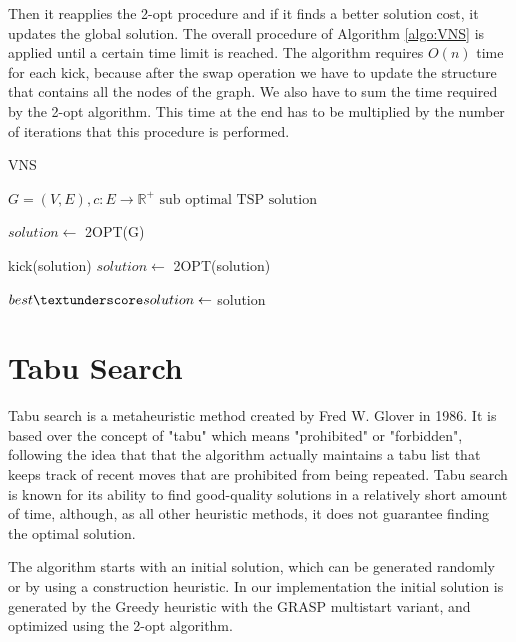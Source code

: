 Then it reapplies the 2-opt procedure and if it finds a better solution cost, it updates the global solution.
The overall procedure of Algorithm \ref{algo:VNS} is applied until a certain time limit is reached.
The algorithm requires $O(n)$ time for each kick, because after the swap operation we have to update the structure that contains all the nodes of the graph. We also have to sum the time required by the 2-opt algorithm. This time at the end has to be multiplied by the number of iterations that this procedure is performed. 

\begin{algorithm}[h!]
    \caption{VNS}\label{algo:VNS}
    \begin{algorithmic}[1]
    \Require $G = (V,E), c:E \to \mathbb{R}^+$
    \Ensure $\text{sub optimal TSP solution}$


    \State $solution \gets$ 2OPT(G)
   
   
    \State kick(solution)   
    \State $ solution \gets $ 2OPT(solution)
    
    
    \State $ best\textunderscore solution \gets$ solution
    \EndIf
    

    \EndWhile

    \end{algorithmic}
\end{algorithm}





\section{Tabu Search}
Tabu search is a metaheuristic method created by Fred W. Glover in 1986.
It is based over the concept of "tabu" which means "prohibited" or "forbidden", following the idea that that the algorithm actually maintains a tabu list that keeps track of recent moves that are prohibited from being repeated. 
Tabu search is known for its ability to find good-quality solutions in a relatively short amount of time, although, as all other heuristic methods, it does not guarantee finding the optimal solution.

The algorithm starts with an initial solution, which can be generated randomly or by using a construction heuristic. In our implementation the initial solution is generated by the Greedy heuristic with the GRASP multistart variant, and optimized using the 2-opt algorithm.

